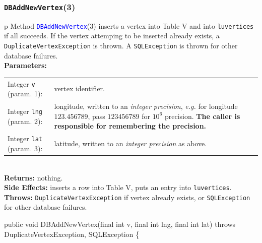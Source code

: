 \documentclass{article}
\theoremstyle{definition}                   %
\begin{document}
\subsubsection{{\tt{}\protect{}DBAddNewVertex}(3)}
\begin{tabular}{p{\textwidth}}
\toprule
{}
Method \textcolor{blue}{{\tt{}\protect{}DBAddNewVertex}}(3) inserts a vertex into
Table V and into {\tt{}\protect{}lu{}vertices} if all succeeds. If the vertex attemping
to be inserted already exists, a {\tt{}DuplicateVertexException} is thrown.
A {\tt{}SQLException} is thrown for other database failures.\\
\midrule
\textbf{Parameters:} \\
\begin{tabular}{lp{116mm}}
Integer {\tt{}v} (param. 1):&vertex identifier.\\
Integer {\tt{}lng} (param. 2):&longitude, written to an \emph{integer
precision}, \emph{e.g.} for longitude $123.456789$, pass $123456789$ for
$10^6$ precision. \textbf{The caller is responsible for remembering the
precision.}\\
Integer {\tt{}lat} (param. 3):&latitude, written to an \emph{integer
precision} as above.
\end{tabular}\\
\textbf{Returns:} nothing.\\
\textbf{Side Effects:} inserts a row into Table V, puts an entry into
{\tt{}\protect{}lu{}vertices}.\\
\textbf{Throws:} {\tt{}DuplicateVertexException} if vertex already exists,
or {\tt{}SQLException} for other database failures.\\
\bottomrule
\end{tabular}
\nwenddocs{}\endmoddef{}
public void DBAddNewVertex(final int v, final int lng, final int lat)
throws DuplicateVertexException, SQLException \{
\eatline
\end{document}
